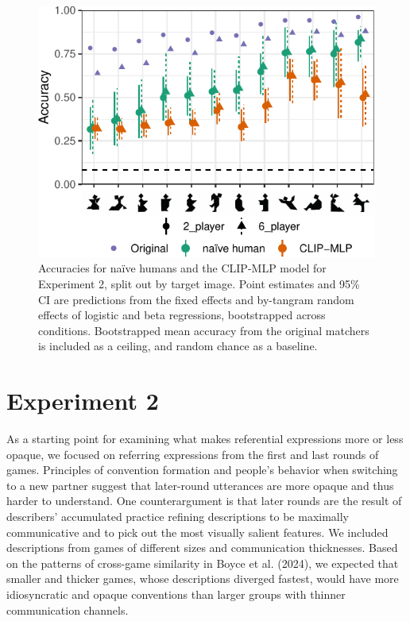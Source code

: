 \documentclass[10pt, letterpaper]{article}
\begin{document}
\begin{CodeChunk}
\begin{figure}[t]

{\centering \includegraphics[width=0.9\linewidth]{figs/fig-2-1} 

}

\caption[Accuracies for naïve humans and the CLIP-MLP model for Experiment 2, split out by target image]{Accuracies for naïve humans and the CLIP-MLP model for Experiment 2, split out by target image. Point estimates and 95\% CI are predictions from the fixed effects and by-tangram random effects of logistic and beta regressions, bootstrapped across conditions. Bootstrapped mean accuracy from the original matchers is included as a ceiling, and random chance as a baseline. \label{expt2-tangram}}\label{fig:fig-2}
\end{figure}
\end{CodeChunk}

\section{Experiment 2}\label{experiment-2}

As a starting point for examining what makes referential expressions
more or less opaque, we focused on referring expressions from the first
and last rounds of games. Principles of convention formation and
people's behavior when switching to a new partner suggest that
later-round utterances are more opaque and thus harder to understand.
One counterargument is that later rounds are the result of describers'
accumulated practice refining descriptions to be maximally communicative
and to pick out the most visually salient features. We included
descriptions from games of different sizes and communication
thicknesses. Based on the patterns of cross-game similarity in Boyce et
al. (2024), we expected that smaller and thicker games, whose
descriptions diverged fastest, would have more idiosyncratic and opaque
conventions than larger groups with thinner communication channels.
\end{document}
